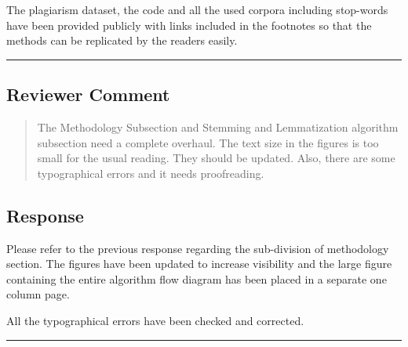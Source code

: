 The plagiarism dataset, the code and all the used corpora including stop-words have been
provided publicly with links included in the footnotes so that the methods can
be replicated by the readers easily.\\


\noindent\rule{17cm}{2.0pt}

\subsection{Reviewer Comment}

\begin{mdframed}
\begin{quote}
The Methodology Subsection and Stemming and Lemmatization algorithm subsection need a complete overhaul. The text size in the figures is too small for the usual reading. They should be updated. Also, there are some typographical errors and it needs proofreading.
\end{quote}
\end{mdframed}

\subsection{Response} 
Please refer to the previous response regarding the sub-division of methodology
section. The figures have been updated to increase visibility and the large figure
containing the entire algorithm flow diagram has been placed in a separate one
column page.

All the typographical errors have been checked and corrected.\\

\noindent\rule{17cm}{6.0pt}
